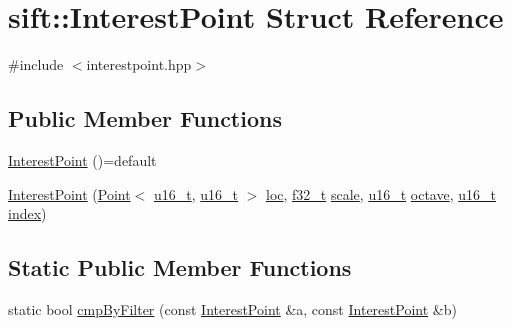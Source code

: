 \hypertarget{structsift_1_1InterestPoint}{}\section{sift\+:\+:Interest\+Point Struct Reference}
\label{structsift_1_1InterestPoint}


{\ttfamily \#include $<$interestpoint.\+hpp$>$}

\subsection*{Public Member Functions}
\begin{DoxyCompactItemize}
\item 
\hyperlink{structsift_1_1InterestPoint_a8ef2ad74ae5d90f5b02c901523937db1}{Interest\+Point} ()=default
\item 
\hyperlink{structsift_1_1InterestPoint_a2845bc92e9896460fa76fbb5e61de457}{Interest\+Point} (\hyperlink{structsift_1_1Point}{Point}$<$ \hyperlink{types_8hpp_a4f53bd979bf45b1ce27e5f43e3a0d33b}{u16\+\_\+t}, \hyperlink{types_8hpp_a4f53bd979bf45b1ce27e5f43e3a0d33b}{u16\+\_\+t} $>$ \hyperlink{structsift_1_1InterestPoint_a843e9ca44ce7ddefead792ca4c787f20}{loc}, \hyperlink{types_8hpp_a37279f6a792de218cef11dff445d532a}{f32\+\_\+t} \hyperlink{structsift_1_1InterestPoint_abcdd744160459cfbd2330b5d6b8a2926}{scale}, \hyperlink{types_8hpp_a4f53bd979bf45b1ce27e5f43e3a0d33b}{u16\+\_\+t} \hyperlink{structsift_1_1InterestPoint_a2daaf1185f5658cabc2e8a3768b7f321}{octave}, \hyperlink{types_8hpp_a4f53bd979bf45b1ce27e5f43e3a0d33b}{u16\+\_\+t} \hyperlink{structsift_1_1InterestPoint_a9ec87bddea9e66a5e7e655ddf6483799}{index})
\end{DoxyCompactItemize}
\subsection*{Static Public Member Functions}
\begin{DoxyCompactItemize}
\item 
static bool \hyperlink{structsift_1_1InterestPoint_a658ee07aa492bafbc30855319133559a}{cmp\+By\+Filter} (const \hyperlink{structsift_1_1InterestPoint}{Interest\+Point} \&a, const \hyperlink{structsift_1_1InterestPoint}{Interest\+Point} \&b)
\end{DoxyCompactItemize}

